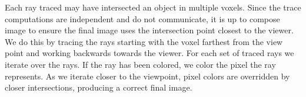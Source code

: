 Each ray traced may have intersected an object in multiple voxels.  Since the 
trace computations are independent and do not communicate, it is up to compose
image to ensure the final image uses the intersection point closest to the 
viewer.  We do this by tracing the rays starting with the voxel farthest from
the view point and working backwards towards the viewer.  For each set of traced
rays we iterate over the rays.  If the ray has been colored, we color the pixel
the ray represents.  As we iterate closer to the viewpoint, pixel colors are
overridden by closer intersections, producing a correct final image. 



















